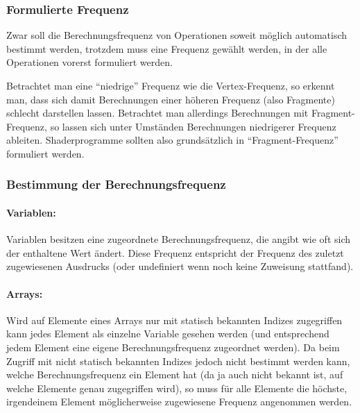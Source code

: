 \subsubsection{Formulierte Frequenz}
\label{formulierte_frequenz}

Zwar soll die Berechnungsfrequenz von Operationen soweit möglich automatisch bestimmt werden, trotzdem muss eine Frequenz
gewählt werden, in der alle Operationen vorerst formuliert werden.

Betrachtet man eine "`niedrige"' Frequenz wie die Vertex-Frequenz, so erkennt man, dass sich damit Berechnungen einer höheren
Frequenz (also Fragmente) schlecht darstellen lassen. Betrachtet man allerdings Berechnungen mit Fragment-Frequenz, so lassen sich
unter Umständen Berechnungen niedrigerer Frequenz ableiten.
Shaderprogramme sollten also grundsätzlich in "`Fragment-Frequenz"' formuliert werden.

\subsubsection{Bestimmung der Berechnungsfrequenz}

\paragraph{Variablen:} Variablen besitzen eine zugeordnete Berechnungsfrequenz, die angibt wie oft sich der enthaltene Wert ändert.
Diese Frequenz entspricht der Frequenz des zuletzt zugewiesenen Ausdrucks (oder undefiniert wenn noch keine Zuweisung stattfand).

\paragraph{Arrays:} %
Wird auf Elemente eines Arrays nur mit statisch bekannten Indizes zugegriffen kann jedes Element als einzelne Variable gesehen werden
(und entsprechend jedem Element eine eigene Berechnungsfrequenz zugeordnet werden).
Da beim Zugriff mit nicht statisch bekannten Indizes jedoch nicht bestimmt werden kann, welche Berechnungsfrequenz ein
Element hat (da ja auch nicht bekannt ist, auf welche Elemente genau zugegriffen wird), so muss für alle Elemente die höchste, irgendeinem Element möglicherweise
zugewiesene Frequenz angenommen werden.

